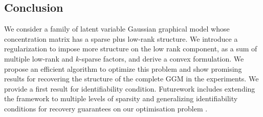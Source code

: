 \documentclass{article}
\begin{document}
\subsection*{Conclusion}
We consider a family of latent variable Gaussian graphical model whose concentration matrix has a sparse plus low-rank structure. We introduce a regularization to impose more structure on the low rank component, as a sum of multiple low-rank and $k$-sparse factors, and derive a convex formulation. We propose an efficient algorithm to optimize this problem and show promising results for recovering the structure of the complete GGM in the experiments. We provide a first result for identifiability condition. Futurework includes extending the framework to multiple levels of sparsity and generalizing identifiability conditions for recovery guarantees on our optimisation problem .
%
%



\end{document}
